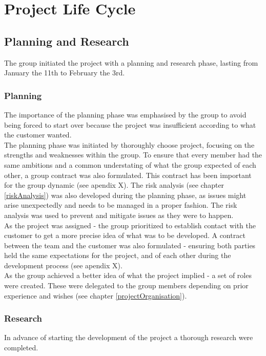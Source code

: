 
\chapter{Project Life Cycle}

\section{Planning and Research}
The group initiated the project with a planning and research phase, lasting from January the 11th to February the 3rd. 

\subsection{Planning}
The importance of the planning phase was emphasised by the group to avoid being forced to start over because the project was insufficient according to what the customer wanted. \\

The planning phase was initiated by thoroughly choose project, focusing on the strengths and weaknesses within the group. To ensure that every member had the same ambitions and a common understating of what the group expected of each other, a group contract was also formulated. This contract has been important for the group dynamic (see apendix X). The risk analysis (see chapter \ref{riskAnalysis}) was also developed during the planning phase, as issues might arise unexpectedly and needs to be managed in a proper fashion. The risk analysis was used to prevent and mitigate issues as they were to happen.  \\  

As the project was assigned - the group prioritized to establish contact with the customer to get a more precise idea of what was to be developed. A contract between the team and the customer was also formulated - ensuring both parties held the same expectations for the project, and of each other during the development process (see apendix X).\\

As the group achieved a better idea of what the project implied - a set of roles were created. These were delegated to the group members depending on prior experience and wishes (see chapter \ref{projectOrganisation}).

\subsection{Research}
In advance of starting the development of the project a thorough research were completed.

